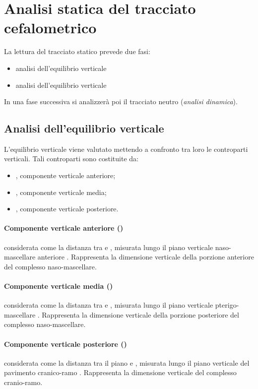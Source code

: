 \section{Analisi statica del tracciato cefalometrico}
La lettura del tracciato statico prevede due fasi:
\begin{itemize}
\item analisi dell'equilibrio verticale
\item analisi dell'equilibrio verticale
\end{itemize}

In una fase successiva si analizzerà poi il tracciato neutro (\textit{analisi dinamica}).

\subsection*{Analisi dell'equilibrio verticale}
L'equilibrio verticale viene valutato mettendo a confronto tra loro le controparti verticali. Tali controparti sono costituite da:
\begin{itemize}
\item {}, componente verticale anteriore;
\item {}, componente verticale media;
\item {}, componente verticale posteriore.
\end{itemize}
\paragraph{Componente verticale anteriore ()} considerata come la distanza tra  e , misurata lungo il piano verticale naso-mascellare anteriore . Rappresenta la dimensione verticale della porzione anteriore del complesso naso-mascellare.
\paragraph{Componente verticale media ()} considerata come la distanza tra  e , misurata lungo il piano verticale pterigo-mascellare . Rappresenta la dimensione verticale della porzione posteriore del complesso naso-mascellare.
\paragraph{Componente verticale posteriore ()} considerata come la distanza tra il piano  e , misurata lungo il piano verticale del pavimento cranico-ramo . Rappresenta la dimensione verticale del complesso cranio-ramo.

